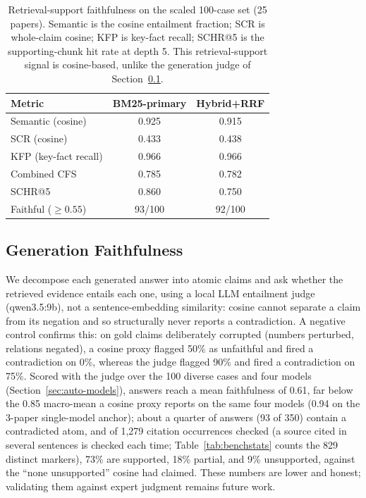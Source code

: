 \documentclass[letterpaper]{article} %
\begin{document}
\begin{table}[t]
  \centering
  \caption{Retrieval-support faithfulness on the scaled 100-case set (25 papers). Semantic
           is the cosine entailment fraction; SCR is whole-claim cosine; KFP is key-fact
           recall; SCHR@5 is the supporting-chunk hit rate at depth 5. This retrieval-support
           signal is cosine-based, unlike the generation judge of Section~\ref{sec:auto-gen}.}
  \label{tab:faith}
  \setlength{\tabcolsep}{5pt}
  \begin{tabular}{lcc}
    \toprule
    \textbf{Metric} & \textbf{BM25-primary} & \textbf{Hybrid+RRF} \\
    \midrule
    Semantic (cosine)    & 0.925 & 0.915 \\
    SCR (cosine)         & 0.433 & 0.438 \\
    KFP (key-fact recall)& 0.966 & 0.966 \\
    Combined CFS         & 0.785 & 0.782 \\
    SCHR@5               & 0.860 & 0.750 \\
    Faithful ($\geq0.55$)& 93/100 & 92/100 \\
    \bottomrule
  \end{tabular}
\end{table}

\subsection{Generation Faithfulness}
\label{sec:auto-gen}
We decompose each generated answer into atomic claims and ask whether the retrieved evidence
entails each one, using a local LLM entailment judge (qwen3.5:9b), not a sentence-embedding
similarity: cosine cannot separate a claim from its negation and so structurally never reports a
contradiction. A negative control confirms this: on gold claims deliberately corrupted (numbers
perturbed, relations negated), a cosine proxy flagged 50\% as unfaithful and fired a contradiction
on 0\%, whereas the judge flagged 90\% and fired a contradiction on 75\%. Scored with the judge
over the 100 diverse cases and four models (Section~\ref{sec:auto-models}), answers reach a mean
faithfulness of 0.61, far below the 0.85 macro-mean a cosine proxy reports on the same four models
(0.94 on the 3-paper single-model anchor); about a quarter of answers (93 of
350) contain a contradicted atom, and of 1{,}279 citation occurrences checked (a source cited in
several sentences is checked each time; Table~\ref{tab:benchstats} counts the 829 distinct
markers), 73\% are supported, 18\%
partial, and 9\% unsupported, against the ``none unsupported'' cosine had claimed. These numbers
are lower and honest; validating them against expert judgment remains future work.
\end{document}
